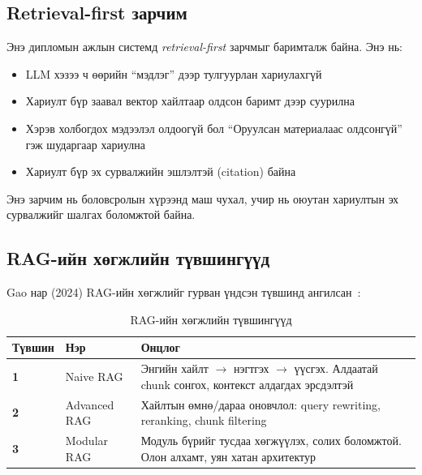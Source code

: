 \documentclass[12pt,A4]{report}
\newcommand{\term}[1]{\textit{#1}}
\begin{document}
\subsection{Retrieval-first зарчим}

Энэ дипломын ажлын системд \term{retrieval-first} зарчмыг баримталж байна. Энэ нь:

\begin{itemize}
    \item LLM хэзээ ч өөрийн ``мэдлэг'' дээр тулгуурлан хариулахгүй
    \item Хариулт бүр заавал вектор хайлтаар олдсон баримт дээр суурилна
    \item Хэрэв холбогдох мэдээлэл олдоогүй бол ``Оруулсан материалаас олдсонгүй'' гэж шударгаар хариулна
    \item Хариулт бүр эх сурвалжийн эшлэлтэй (citation) байна
\end{itemize}

Энэ зарчим нь боловсролын хүрээнд маш чухал, учир нь оюутан хариултын эх сурвалжийг шалгах боломжтой байна.

\subsection{RAG-ийн хөгжлийн түвшингүүд}

Gao нар (2024) RAG-ийн хөгжлийг гурван үндсэн түвшинд ангилсан~\cite{gao2024}:

\begin{table}[h!]
\centering
\caption{RAG-ийн хөгжлийн түвшингүүд}
\label{tab:rag_paradigms}
\begin{tabularx}{\textwidth}{>{\bfseries}l l X}
\toprule
\textbf{Түвшин} & \textbf{Нэр} & \textbf{Онцлог} \\
\midrule
\rowcolor{lightbg}
1 & Naive RAG & Энгийн хайлт $\rightarrow$ нэгтгэх $\rightarrow$ үүсгэх. Алдаатай chunk сонгох, контекст алдагдах эрсдэлтэй \\
2 & Advanced RAG & Хайлтын өмнө/дараа оновчлол: query rewriting, reranking, chunk filtering \\
\rowcolor{lightbg}
3 & Modular RAG & Модуль бүрийг тусдаа хөгжүүлэх, солих боломжтой. Олон алхамт, уян хатан архитектур \\
\bottomrule
\end{tabularx}
\end{table}
\end{document}
